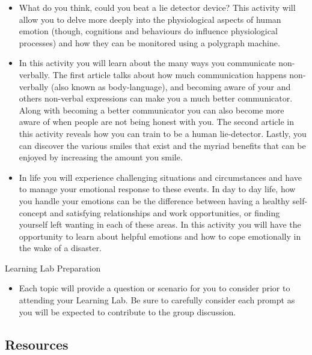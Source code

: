 \documentclass[
]{book}
\providecommand{\tightlist}{%
  \setlength{\itemsep}{0pt}\setlength{\parskip}{0pt}}
\begin{document}
\begin{reflect}
\begin{itemize}
\tightlist
\item
  What do you think, could you beat a lie detector device? This activity will allow you to delve more deeply into the physiological aspects of human emotion (though, cognitions and behaviours do influence physiological processes) and how they can be monitored using a polygraph machine.
\item
  In this activity you will learn about the many ways you communicate non-verbally. The first article talks about how much communication happens non-verbally (also known as body-language), and becoming aware of your and others non-verbal expressions can make you a much better communicator. Along with becoming a better communicator you can also become more aware of when people are not being honest with you. The second article in this activity reveals how you can train to be a human lie-detector. Lastly, you can discover the various smiles that exist and the myriad benefits that can be enjoyed by increasing the amount you smile.\\
\item
  In life you will experience challenging situations and circumstances and have to manage your emotional response to these events. In day to day life, how you handle your emotions can be the difference between having a healthy self-concept and satisfying relationships and work opportunities, or finding yourself left wanting in each of these areas. In this activity you will have the opportunity to learn about helpful emotions and how to cope emotionally in the wake of a disaster.
\end{itemize}

{Learning Lab Preparation}

\begin{itemize}
\tightlist
\item
  Each topic will provide a question or scenario for you to consider prior to attending your Learning Lab. Be sure to carefully consider each prompt as you will be expected to contribute to the group discussion.
\end{itemize}
\end{reflect}

\hypertarget{resources-8}{%
\subsection*{Resources}\label{resources-8}}
\end{document}
